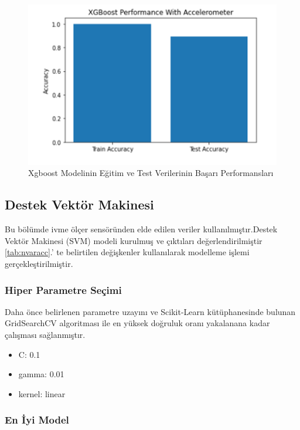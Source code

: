 \documentclass[12pt,twoside]{deuthesis}
\providecommand{\tightlist}{%
  \setlength{\itemsep}{0pt}\setlength{\parskip}{0pt}}
\begin{document}
\begin{figure}

{\centering \includegraphics[width=0.6\linewidth,height=0.25\textheight]{figure/ixgboost_testtrain} 

}

\caption{Xgboost Modelinin Eğitim ve Test Verilerinin Başarı Performansları}\label{fig:ixgboosttesttrain}
\end{figure}
\hypertarget{destek-vektuxf6r-makinesi-2}{%
\subsection{Destek Vektör Makinesi}\label{destek-vektuxf6r-makinesi-2}}

Bu bölümde ivme ölçer sensöründen elde edilen veriler kullanılmıştır.Destek Vektör Makinesi (SVM) modeli kurulmuş ve çıktıları değerlendirilmiştir
\ref{tab:nvaracc}.' te belirtilen değişkenler kullanılarak modelleme işlemi gerçekleştirilmiştir.

\hypertarget{hiper-parametre-seuxe7imi-7}{%
\subsubsection{Hiper Parametre Seçimi}\label{hiper-parametre-seuxe7imi-7}}

Daha önce belirlenen parametre uzayını ve Scikit-Learn kütüphanesinde bulunan GridSearchCV algoritması ile en yüksek doğruluk oranı yakalanana kadar çalışması sağlanmıştır.
\begin{itemize}
\tightlist
\item
  C: 0.1
\item
  gamma: 0.01
\item
  kernel: linear
\end{itemize}
\hypertarget{en-iyi-model-8}{%
\subsubsection{En İyi Model}\label{en-iyi-model-8}}
\end{document}
